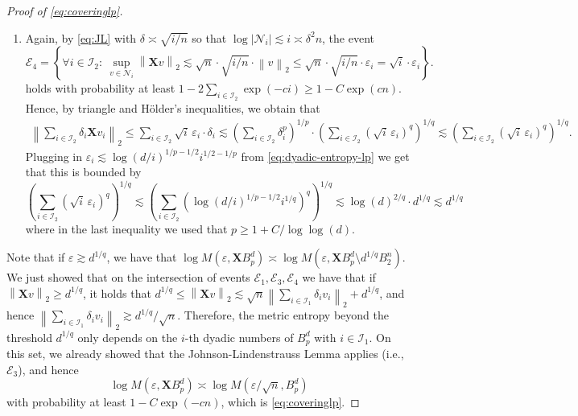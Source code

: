 \documentclass[a4paper]{article}
\newcommand{\mathset}[1]{\left\{#1\right\}}
\newcommand{\pr}[1]{\left(#1\right)}
\newcommand{\abs}[1]{\left\lvert#1\right\rvert}
\newcommand{\norm}[1]{\left\|#1\right\|}
\newcommand{\X}[0]{\mathbf{X}}
\newcommand{\cE}[0]{\mathcal{E}}
\newcommand{\cI}[0]{\mathcal{I}}
\newcommand{\cN}[0]{\mathcal{N}}
\newcommand{\eps}[0]{\varepsilon}
\theoremstyle{thmstyle}
\theoremstyle{defstyle}
\theoremstyle{remark}
\begin{document}
\begin{proof}[Proof of \eqref{eq:coveringlp}]
\begin{enumerate}
        \item Again, by \eqref{eq:JL} with $\delta\asymp \sqrt{i/n}$ so that $\log \abs{\cN_i} \lesssim i \asymp \delta^2 n$, the event
        \begin{equation*}
            \cE_4=\mathset{\forall i \in \cI_2:\ \sup_{v \in \cN_i}\norm{ \X v }_{2} \lesssim \sqrt{n} \cdot \sqrt{i/n}   \cdot \norm{v}_2 \leq  \sqrt{n} \cdot \sqrt{i/n}   \cdot \eps_i = \sqrt{i} \cdot \eps_i}.
        \end{equation*}
        holds with probability at least $1-2\sum_{i\in \cI_2}\exp(-c i)\geq 1-C\exp(cn)$. 
        Hence, by triangle and Hölder's inequalities, we obtain that 
        \begin{align*}
            \norm{\sum_{i \in \cI_2} \delta_i \mathbf{X} v_i }_{2} 
            \leq \sum_{i \in \cI_2} \sqrt{i} \, \varepsilon_i \cdot \delta_i \lesssim \left(\sum_{i \in \cI_2} \delta_i^p \right)^{1/p} \cdot \left(\sum_{i \in \cI_2} (\sqrt{i} \, \varepsilon_i)^{q} \right)^{1/q} \lesssim \left(\sum_{i \in \cI_2} (\sqrt{i} \, \varepsilon_i)^{q} \right)^{1/q}.
        \end{align*}
        Plugging in $\eps_i\lesssim \log(d/i)^{1/p-1/2} i^{1/2-1/p}$ from \eqref{eq:dyadic-entropy-lp} we get that this is bounded by
        \begin{equation*}
             \left(\sum_{i \in \cI_2} (\sqrt{i} \, \varepsilon_i)^{q} \right)^{1/q}\lesssim \left(\sum_{i \in \cI_2} \left( \log(d/i)^{1/p - 1/2} i^{1/q} \right)^{q} \right)^{1/q} \lesssim \log(d)^{2/q} \cdot d^{1/q} \lesssim d^{1/q}
        \end{equation*}
        where in the last inequality we used that $p \geq 1 + C/\log\log(d)$. 
    \end{enumerate}
    Note that if $\eps \gtrsim d^{1/q}$, we have that $\log M(\eps, \X B_p^d)\asymp \log M(\eps, \X B_p^d \setminus d^{1/q }B_2^n)$. 
    We just showed that on the intersection of events $\cE_1,\cE_3, \cE_4$ we have that if $\norm{\X v}_2 \geq d^{1/q}$, it holds that $d^{1/q} \leq \norm{\X v}_2 \lesssim \sqrt{n} \norm{\sum_{i\in \cI_1} \delta_i v_i}_2 + d^{1/q}$, and hence $\norm{\sum_{i\in \cI_1} \delta_i v_i}_2\gtrsim d^{1/q}/\sqrt{n}$.
    Therefore, the metric entropy beyond the threshold $d^{1/q}$ only depends on the $i$-th dyadic numbers of $B_p^d$ with $i\in \cI_1$. On this set, we already showed that the Johnson-Lindenstrauss Lemma applies (i.e., $\cE_3$), and hence
    \begin{equation*}
        \log M(\eps, \X B_p^d) \asymp \log M(\eps /\sqrt{n}, B_p^d)
    \end{equation*}
    with probability at least $1-C\exp\pr{-c n}$, which is \eqref{eq:coveringlp}.
\end{proof}
\end{document}
